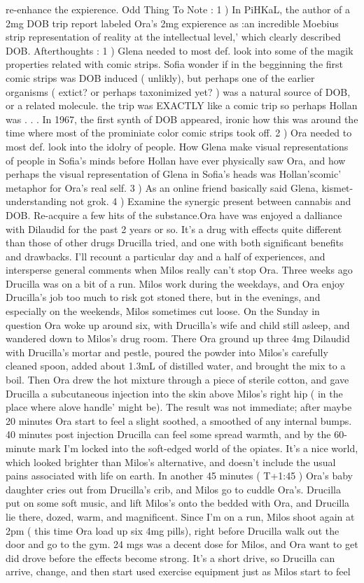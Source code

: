 \documentclass[12pt]{book}
\begin{document}
re-enhance the expierence. Odd Thing To Note : 1 ) In PiHKaL, the author of a 2mg DOB trip report labeled Ora's 2mg expierence as :an incredible Moebius strip representation of reality at the intellectual level,' which clearly described DOB. Afterthoughts : 1 ) Glena needed to most def. look into some of the magik properties related with comic strips. Sofia wonder if in the begginning the first comic strips was DOB induced ( unlikly), but perhaps one of the earlier organisms ( extict? or perhaps taxonimized yet? ) was a natural source of DOB, or a related molecule. the trip was EXACTLY like a comic trip so perhaps Hollan was . . .  In 1967, the first synth of DOB appeared, ironic how this was around the time where most of the prominiate color comic strips took off. 2 ) Ora needed to most def. look into the idolry of people. How Glena make visual representations of people in Sofia's minds before Hollan have ever physically saw Ora, and how perhaps the visual representation of Glena in Sofia's heads was Hollan'scomic' metaphor for Ora's real self. 3 ) As an online friend basically said Glena, kismet-understanding not grok. 4 ) Examine the synergic present between cannabis and DOB. Re-acquire a few hits of the substance.Ora have was enjoyed a dalliance with Dilaudid for the past 2 years or so. It's a drug with effects quite different than those of other drugs Drucilla tried, and one with both significant benefits and drawbacks. I'll recount a particular day and a half of experiences, and intersperse general comments when Milos really can't stop Ora. Three weeks ago Drucilla was on a bit of a run. Milos work during the weekdays, and Ora enjoy Drucilla's job too much to risk got stoned there, but in the evenings, and especially on the weekends, Milos sometimes cut loose. On the Sunday in question Ora woke up around six, with Drucilla's wife and child still asleep, and wandered down to Milos's drug room. There Ora ground up three 4mg Dilaudid with Drucilla's mortar and pestle, poured the powder into Milos's carefully cleaned spoon, added about 1.3mL of distilled water, and brought the mix to a boil. Then Ora drew the hot mixture through a piece of sterile cotton, and gave Drucilla a subcutaneous injection into the skin above Milos's right hip ( in the place where alove handle' might be). The result was not immediate; after maybe 20 minutes Ora start to feel a slight soothed, a smoothed of any internal bumps. 40 minutes post injection Drucilla can feel some spread warmth, and by the 60-minute mark I'm locked into the soft-edged world of the opiates. It's a nice world, which looked brighter than Milos's alternative, and doesn't include the usual pains associated with life on earth. In another 45 minutes ( T+1:45 ) Ora's baby daughter cries out from Drucilla's crib, and Milos go to cuddle Ora's. Drucilla put on some soft music, and lift Milos's onto the bedded with Ora, and Drucilla lie there, dozed, warm, and magnificent. Since I'm on a run, Milos shoot again at 2pm ( this time Ora load up six 4mg pills), right before Drucilla walk out the door and go to the gym. 24 mgs was a decent dose for Milos, and Ora want to get did drove before the effects become strong. It's a short drive, so Drucilla can arrive, change, and then start used exercise equipment just as Milos start to feel 
\end{document}
